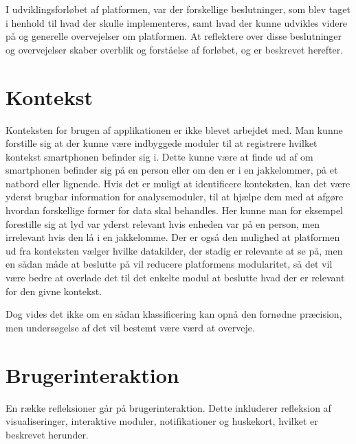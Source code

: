 I udviklingsforløbet af platformen, var der forskellige beslutninger, som blev taget i henhold til hvad der skulle implementeres, samt hvad der kunne udvikles videre på og generelle overvejelser om platformen.
At reflektere over disse beslutninger og overvejelser skaber overblik og forståelse af forløbet, og er beskrevet herefter.


\section{Kontekst}
Konteksten for brugen af applikationen er ikke blevet arbejdet med.
Man kunne forstille sig at der kunne være indbyggede moduler til at registrere hvilket kontekst smartphonen befinder sig i.
Dette kunne være at finde ud af om smartphonen befinder sig på en person eller om den er i en jakkelommer, på et natbord eller lignende.
Hvis det er muligt at identificere konteksten, kan det være yderst brugbar information for analysemoduler, til at hjælpe dem med at afgøre hvordan forskellige former for data skal behandles.
Her kunne man for eksempel forestille sig at lyd var yderst relevant hvis enheden var på en person, men irrelevant hvis den lå i en jakkelomme.
Der er også den mulighed at platformen ud fra konteksten vælger hvilke datakilder, der stadig er relevante at se på, men en sådan måde at beslutte på vil reducere platformens modularitet, så det vil være bedre at overlade det til det enkelte modul at beslutte hvad der er relevant for den givne kontekst.

Dog vides det ikke om en sådan klassificering kan opnå den fornødne præcision, men undersøgelse af det vil bestemt være værd at overveje.

\section{Brugerinteraktion}
En række refleksioner går på brugerinteraktion.
Dette inkluderer refleksion af visualiseringer, interaktive moduler, notifikationer og huskekort, hvilket er beskrevet herunder.

